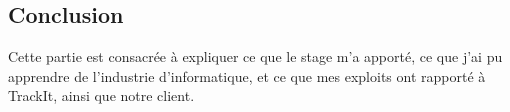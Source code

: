 
\begin{coverpage}
  \chapter{Conclusion}

  Cette partie est consacrée à expliquer
  ce que le stage m'a apporté, ce que j'ai
  pu apprendre de l'industrie d'informatique,
  et ce que mes exploits ont rapporté à TrackIt,
  ainsi que notre client.
\end{coverpage}

